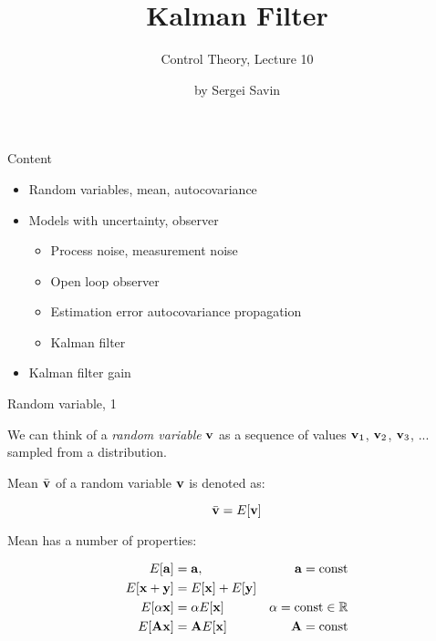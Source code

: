 \documentclass{beamer}
\title{Kalman Filter}
\subtitle{Control Theory, Lecture 10}
\author{by Sergei Savin}
\date{\mydate}
\begin{document}
\maketitle



\begin{frame}{Content}
\begin{itemize}
\item Random variables, mean, autocovariance
\item Models with uncertainty, observer
\begin{itemize}
	\item Process noise, measurement noise
	\item Open loop observer
	\item Estimation error autocovariance propagation
	\item Kalman filter
\end{itemize}
\item Kalman filter gain
\end{itemize}
\end{frame}




\begin{frame}{Random variable, 1}
\begin{flushleft}

We can think of a \emph{random variable} $\mathbf{v}$ as a sequence of values $\mathbf{v}_1$, $\mathbf{v}_2$, $\mathbf{v}_3$, ... sampled from a distribution.

\bigskip

Mean $\bar{\mathbf{v}}$ of a random variable $\mathbf{v}$ is denoted as:

\begin{equation}
	\bar{\mathbf{v}} = E[\mathbf{v}]
\end{equation}

Mean has a number of properties:

\begin{align}
	E[\mathbf{a}] &= \mathbf{a}, & \mathbf{a}= \text{const} \\
	E[\mathbf{x}+\mathbf{y}] &= E[\mathbf{x}] + E[\mathbf{y}] &\\
	E[\alpha \mathbf{x}] &= \alpha  E[\mathbf{x}]  & \alpha = \text{const} \in \mathbb{R} \\
	E[\mathbf{A} \mathbf{x}] &= \mathbf{A}  E[\mathbf{x}] & \mathbf{A} = \text{const}
\end{align}


\end{flushleft}
\end{frame}
\end{document}
